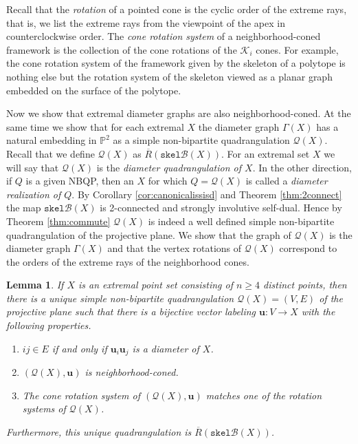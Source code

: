 \documentclass[10pt,a4paper]{article}
\newtheorem{lemma}[theorem]{Lemma}
\newcounter{example}
\newcommand{\vu}[0]{\mathbf{u}}
\newcommand{\Pb}[0]{\mathbb{P}}
\newcommand{\Kc}[0]{\mathcal{K}}
\newcommand{\Bc}[0]{\mathcal{B}}
\newcommand{\skel}[0]{\mathtt{skel}}
\newcommand{\qt}{\mathcal{Q}}
\begin{document}
Recall that the \emph{rotation} of a pointed cone is the cyclic order of the extreme rays, that is, we list the extreme rays from the viewpoint of the apex in counterclockwise order. The \emph{cone rotation system} of a neighborhood-coned framework is the collection of the cone rotations of the $\Kc_i$ cones. For example, the cone rotation system of the framework given by the skeleton of a polytope is nothing else but the rotation system of the skeleton viewed as a planar graph embedded on the surface of the polytope.

Now we show that extremal diameter graphs are also neighborhood-coned. At the same time we show that for each extremal $X$ the diameter graph $\Gamma(X)$ has a natural embedding in  $\Pb^2$ as a simple non-bipartite quadrangulation $\qt(X)$. Recall that we define $\qt(X)$ as $\overline R(\skel\Bc(X))$. For an extremal set $X$ we will say that $\qt(X)$ is the \emph{diameter quadrangulation of $X$}.  In the other direction, if $Q$ is a given NBQP, then an $X$ for which $Q=\qt(X)$ is called a \emph{diameter realization of $Q$}. By Corollary \ref{cor:canonicalissisd} and Theorem \ref{thm:2connect} the map $\skel\Bc(X)$ is 2-connected and strongly involutive self-dual. Hence by Theorem \ref{thm:commute} $\qt(X)$ is indeed a well defined simple non-bipartite quadrangulation of the projective plane. We show that the graph of $\qt(X)$ is the diameter graph $\Gamma(X)$ and that the vertex rotations of $\qt(X)$ correspond to the orders of the extreme rays of the neighborhood cones. 

\begin{lemma}\label{lem:diameterispolyhedral}
    If $X$ is an extremal point set consisting of $n\ge 4$ distinct points, then there is a unique simple non-bipartite quadrangulation $\qt(X)=(V,E)$ of the projective plane such that there is a bijective vector labeling $\vu:V\rightarrow X$ with the following properties. 
    \begin{enumerate}[label=\alph*)]
    \item $ij\in E$ if and only if $\vu_i\vu_j$ is a diameter of $X$.
    \item $(\qt(X),\vu)$ is neighborhood-coned.
   \item The cone rotation system of $(\qt(X),\vu)$ matches one of the rotation systems of $\qt(X)$.
    \end{enumerate}
Furthermore, this unique quadrangulation is $\overline{R}(\skel\Bc(X))$.
    
\end{lemma}
\end{document}
